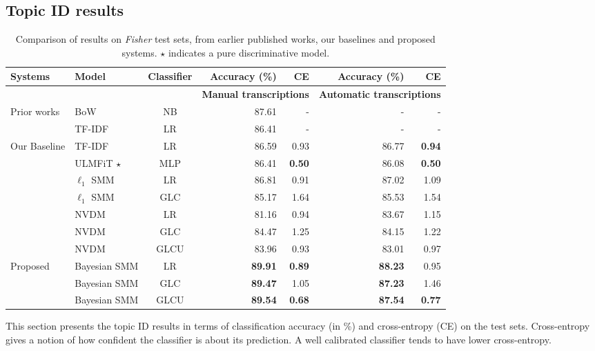 \documentclass[journal]{IEEEtran}
\begin{document}
\subsection{Topic ID results}
\label{ssec:topic_id}
\begin{table*}[!t]
 \begin{center}
 \caption{\label{tab:res}Comparison of results on \textit{Fisher} test sets, 
	from earlier published works, our baselines and proposed systems. \(\star\) 
	indicates a pure discriminative model.}
 \begin{tabular}{llcrrrr} \toprule
  \bf{Systems} & \bf{Model} & \bf{Classifier} & \bf{Accuracy (\%)} & \bf{CE} & 
  \bf{Accuracy (\%)} & \bf{CE} \\ \midrule
 & & & \multicolumn{2}{c}{\bf{Manual transcriptions}} & 
 \multicolumn{2}{c}{\bf{Automatic transcriptions}}\\ \midrule
 \multirow{2}{*}{Prior works} & BoW~\cite{Hazen:2007:ASRU} & NB & 87.61 &-&-&-\\
  &TF-IDF ~\cite{May:2015:mivec} & LR   & 86.41       &  - & - & -     \\
	\midrule
  \multirow{7}{*}{Our Baseline} & TF-IDF & LR & 86.59 & 0.93 & 86.77 & 
  \textbf{0.94} \\
 &ULMFiT \(\star\)   & MLP  & 86.41 & \textbf{0.50} & 86.08 & \textbf{0.50} 
		\\ \cmidrule{2-7}
 &\(\ell_1\) SMM      & LR   & 86.81 & 0.91 & 87.02 & 1.09 \\
 &\(\ell_1\) SMM      & GLC  & 85.17 & 1.64 & 85.53 & 1.54 \\ \cmidrule{2-7}
 &NVDM                       & LR    & 81.16 & 0.94 & 83.67 & 1.15 \\
 &NVDM                       & GLC   & 84.47 & 1.25 & 84.15 & 1.22 \\
 &NVDM                       & GLCU  & 83.96 & 0.93 & 83.01 & 0.97 \\ \midrule
 \multirow{3}{*}{Proposed} &Bayesian SMM& LR& \textbf{89.91} &  \textbf{0.89} 
 & \textbf{88.23} & 0.95\\
 &	Bayesian SMM  & GLC & \textbf{89.47} & 1.05 & \textbf{87.23} & 1.46 \\
 &	Bayesian SMM & GLCU   & \textbf{89.54} & \textbf{0.68} & 		
 \textbf{87.54} & \textbf{0.77} \\
 \bottomrule
 \end{tabular}
 \end{center}
\end{table*}
This section presents the topic ID results in terms of classification 
accuracy (in \%) and cross-entropy (CE) on the test sets. Cross-entropy gives
a notion of how confident the classifier is about its prediction. A well 
calibrated classifier tends to have lower cross-entropy.
\end{document}
